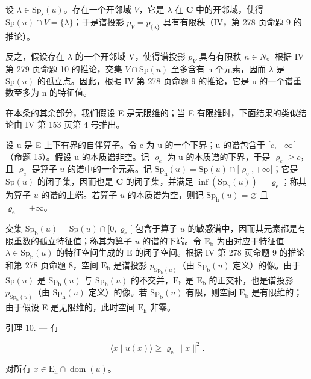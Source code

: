 设 \(\lambda \in \mathrm{Sp}_{\mathrm{s}}(u)\)。存在一个开邻域 \(V\)，它是 \(\lambda\) 在 \(\mathbf{C}\) 中的开邻域，使得 \(\mathrm{Sp}(u) \cap V = \{\lambda\}\)；于是谱投影 \(p_V = p_{\{\lambda\}}\) 具有有限秩（IV，第 278 页命题 9 的推论）。

反之，假设存在 \(\lambda\) 的一个开邻域 V，使得谱投影 \(p_{V}\) 具有有限秩 \(n \in N\)。根据 IV 第 279 页命题 10 的推论，交集 \(V \cap \mathrm{Sp}(u)\) 至多含有 n 个元素，因而 \(\lambda\) 是 \(\mathrm{Sp}(u)\) 的孤立点。因此，根据 IV 第 278 页命题 9 的推论，它是 u 的一个谱重数至多为 n 的特征值。

在本条的其余部分，我们假设 E 是无限维的；当 E 有限维时，下面结果的类似结论由 IV 第 153 页第 4 号推出。

设 u 是 E 上下有界的自伴算子。令 c 为 u 的一个下界；u 的谱包含于 \([c, +\infty[\)（命题 15）。假设 u 的本质谱非空。记 \(\varrho_{e}\) 为 u 的本质谱的下界，于是 \(\varrho_{e} \geqslant c\)，且 \(\varrho_{e}\) 是算子 \(u\) 的谱中的一个元素。记 \(\mathrm{Sp}_{\mathrm{h}}(u) = \mathrm{Sp}(u) \cap [\varrho_{\mathrm{e}}, +\infty[\)；它是 \(\mathrm{Sp}(u)\) 的闭子集，因而也是 \(\mathbf{C}\) 的闭子集，并满足 \(\inf (\mathrm{Sp}_{\mathrm{h}}(u)) = \varrho_{\mathrm{e}}\)；称其为算子 \(u\) 的谱的上端。若算子 \(u\) 的本质谱为空，则记 \(\mathrm{Sp}_{\mathrm{h}}(u) = \varnothing\) 且 \(\varrho_{\mathrm{e}} = +\infty\)。

交集 \(\mathrm{Sp}_{\mathrm{b}}(u) = \mathrm{Sp}(u) \cap [0, \varrho_{\mathrm{e}}[\) 包含于算子 \(u\) 的敏感谱中，因而其元素都是有限重数的孤立特征值；称其为算子 \(u\) 的谱的下端。令 \(\mathrm{E}_{\mathrm{b}}\) 为由对应于特征值 \(\lambda \in \mathrm{Sp}_{\mathrm{b}}(u)\) 的特征空间生成的 E 的闭子空间。根据 IV 第 278 页命题 9 的推论和第 278 页命题 8，空间 \(\mathrm{E}_{\mathrm{b}}\) 是谱投影 \(p_{\mathrm{Sp}_{\mathrm{b}}(u)}\)（由 \(\mathrm{Sp}_{\mathrm{b}}(u)\) 定义）的像。由于 \(\mathrm{Sp}(u)\) 是 \(\mathrm{Sp}_{\mathrm{b}}(u)\) 与 \(\mathrm{Sp}_{\mathrm{h}}(u)\) 的不交并，\(\mathrm{E}_{\mathrm{h}}\) 是 \(\mathrm{E}_{\mathrm{b}}\) 的正交补，也是谱投影 \(p_{\mathrm{Sp}_{\mathrm{h}}(u)}\)（由 \(\mathrm{Sp}_{\mathrm{h}}(u)\) 定义）的像。若 \(\mathrm{Sp}_{\mathrm{b}}(u)\) 有限，则空间 \(\mathrm{E}_{\mathrm{b}}\) 是有限维的；由于假设 E 是无限维的，此时空间 \(\mathrm{E}_{\mathrm{h}}\) 非零。

引理 10. --- 有

\[
\langle x \mid u (x) \rangle \geqslant \varrho_ {\mathrm{e}} \| x \| ^ {2}.\tag{18}
\]

对所有 \(x \in \mathrm{E}_{\mathrm{h}} \cap \operatorname{dom}(u)\)。

